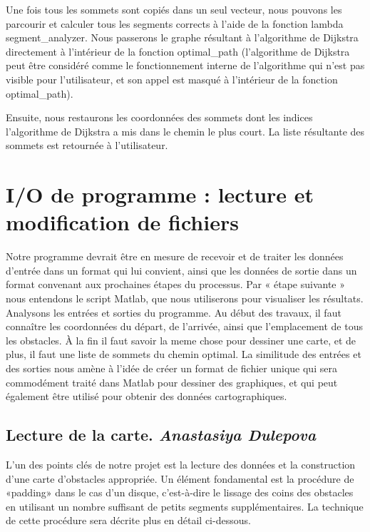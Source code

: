 \documentclass[12pt]{article}
\begin{document}
	Une fois tous les sommets sont copiés dans un seul vecteur, nous pouvons les parcourir et calculer tous les segments corrects à l'aide de la fonction lambda segment\_analyzer. Nous passerons le graphe résultant à l'algorithme de Dijkstra directement à l'intérieur de la fonction optimal\_path (l'algorithme de Dijkstra peut être considéré comme le fonctionnement interne de l'algorithme qui n'est pas visible pour l'utilisateur, et son appel est masqué à l'intérieur de la fonction optimal\_path).
	
	Ensuite, nous restaurons les coordonnées des sommets dont les indices l'algorithme de Dijkstra a mis dans le chemin le plus court. La liste résultante des sommets est retournée à l'utilisateur.
	
	
	
	\section{I/O de programme : lecture et modification de fichiers}
	
	Notre programme devrait être en mesure de recevoir et de traiter les données d'entrée dans un format qui lui convient, ainsi que les données de sortie dans un format convenant aux prochaines étapes du processus. Par « étape suivante » nous entendons le script Matlab, que nous utiliserons pour visualiser les résultats. Analysons les entrées et sorties du programme. Au début des travaux, il faut connaître les coordonnées du départ, de l'arrivée, ainsi que l'emplacement de tous les obstacles. À la fin il faut savoir la meme chose pour dessiner une carte, et de plus, il faut une liste de sommets du chemin optimal. La similitude des entrées et des sorties nous amène à l'idée de créer un format de fichier unique qui sera commodément traité dans Matlab pour dessiner des graphiques, et qui peut également être utilisé pour obtenir des données cartographiques.
	
	\subsection {Lecture de la carte. \textit{Anastasiya Dulepova}} 
	L'un des points clés de notre projet est la lecture des données et la construction d'une carte d'obstacles appropriée. Un élément fondamental est la procédure de «padding» dans le cas d'un disque, c'est-à-dire le lissage des coins des obstacles en utilisant un nombre suffisant de petits segments supplémentaires. La technique de cette procédure sera décrite plus en détail ci-dessous.
	
\end{document}
